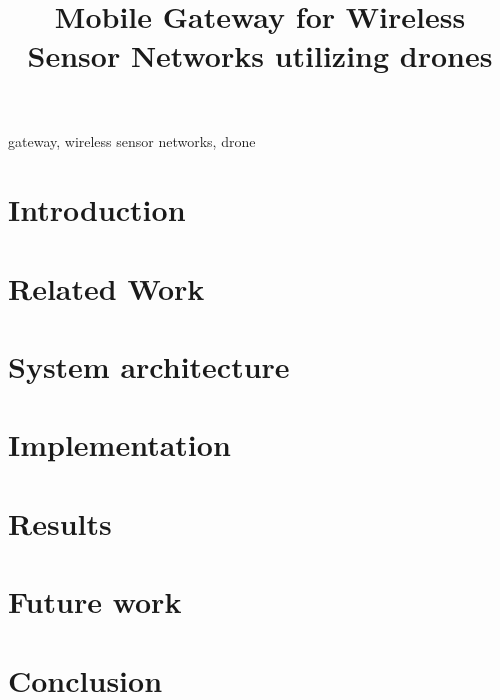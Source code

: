 \documentclass[conference]{IEEEtran}
\begin{document}
\title{Mobile Gateway for Wireless Sensor Networks utilizing drones}

\author{
  }


\maketitle

\begin{abstract}

\end{abstract}

\begin{IEEEkeywords}
gateway, wireless sensor networks, drone
\end{IEEEkeywords}

\section{Introduction}
\label{sec:introduction}


\section{Related Work}
\label{sec:related}


\section{System architecture}
\label{sec:architecture}


\section{Implementation}
\label{sec:implementation}



\section{Results}
\label{sec:results}


\section{Future work}
\label{sec:future}


\section{Conclusion}
\label{sec:conclusion}






\end{document}
